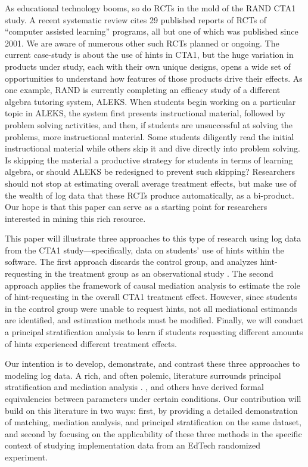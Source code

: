 \documentclass{article}\usepackage[]{graphicx}\usepackage[]{color}
\begin{document}
As educational technology booms, so do RCTs in the mold of the RAND
CTA1 study. A recent systematic review \citep{escueta2017education} cites 29
published reports of RCTs of ``computer assisted learning'' programs,
all but one of which was published since 2001. We are aware of
numerous other such RCTs planned or ongoing. The current case-study is
about the use of hints in CTA1, but the huge variation in products
under study, each with their own unique designs, opens a wide set of opportunities to understand how features of those
products drive their effects. As one example, RAND is currently
completing an efficacy study of a different algebra tutoring system,
ALEKS. When students begin working on a particular topic in ALEKS, the
system first presents instructional material, followed by problem
solving activities, and then, if students are unsuccessful at solving
the problems, more instructional material. Some students diligently
read the initial instructional material while others skip it and dive
directly into problem solving. Is skipping the material a productive
strategy for students in terms of learning algebra, or should ALEKS be
redesigned to prevent such skipping? Researchers should not stop at
estimating overall average treatment effects, but make use of the
wealth of log data that these RCTs produce automatically, as a
bi-product. Our hope is that this paper can serve as a starting point
for researchers interested in mining this rich resource.

This paper will illustrate three approaches to this type of research
using log data from the CTA1 study---specifically, data on students' use
of hints within the software.
The first approach discards the control group, and analyzes
hint-requesting in the treatment group as an observational study
\citep[c.f.][]{rosenbaum2002observational}. The
second approach applies the framework of causal mediation analysis
\citep{vanderweele2015explanation,hong2015causality,imai2011unpacking} to estimate the role of
hint-requesting in the overall CTA1 treatment effect. However, since
students in the control group were unable to request hints, not all
mediational estimands are identified, and estimation methods must be
modified.
Finally, we will conduct a principal stratification analysis
\citep{frangakis} to learn if students requesting different amounts of
hints experienced different treatment effects.

Our intention is to develop, demonstrate, and contrast these three
approaches to modeling log data.
A rich, and often polemic, literature surrounds principal
stratification and mediation analysis
\citep[e.g.][]{rubin2004direct,vanderweele2011principal,pearl2011principal,mealli2012refreshing,vanderweele2012comments}.
\citet{vanderweele2008simple}, \citet{jo2008causal} and others have
derived formal equivalencies between parameters under certain
conditions.
Our contribution will build on this literature in two ways: first, by
providing a detailed demonstration of matching, mediation analysis,
and principal stratification on the same dataset, and second by
focusing on the applicability of these three methods in the specific
context of studying implementation data from an EdTech randomized
experiment.
\end{document}
